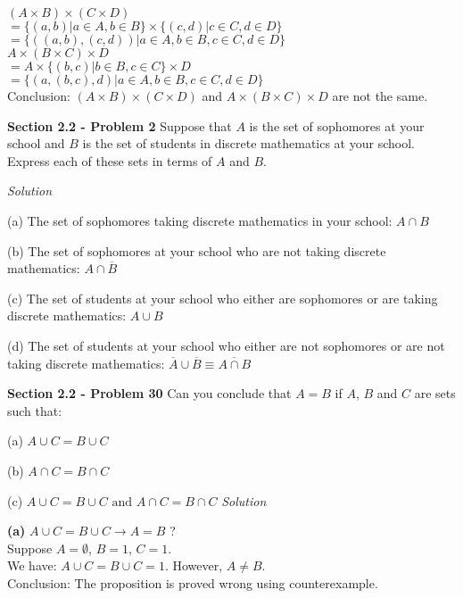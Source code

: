 \documentclass[10pt]{article}
\renewcommand{\implies}{\rightarrow}
\begin{document}
    $(A \times B) \times (C \times D)$ \\
    $= \{(a, b) | a \in A, b \in B\} \times \{(c, d) | c \in C, d \in D\} $ \\
    $= \{((a, b), (c, d)) | a \in A, b \in B, c \in C, d \in D\}$ \\
    \break
    $A \times (B \times C) \times D$ \\
    $= A \times \{(b, c) | b \in B, c \in C\} \times D$ \\
    $= \{(a, (b, c), d) | a \in A, b \in B, c \in C, d \in D\}$ \\
    \break
    Conclusion: $(A \times B) \times (C \times D)$ and $A \times (B \times C) \times D$
    are not the same.


\clearpage
\textbf{Section 2.2 - Problem 2} Suppose that $A$ is the set of sophomores at your school
and $B$ is the set of students in discrete mathematics at your school. Express each of these
sets in terms of $A$ and $B$.

\bigbreak
\textit{Solution} 
\bigbreak

    \par (a) The set of sophomores taking discrete mathematics in your school: $A \cap B$
    \par (b) The set of sophomores at your school who are not taking discrete mathematics:
    $A \cap \overline{B}$
    \par (c) The set of students at your school who either are sophomores or are taking
    discrete mathematics: $A \cup B$
    \par (d) The set of students at your school who either are not sophomores or are not
    taking discrete mathematics: $\overline{A} \cup \overline{B} \equiv \overline{A \cap B}$

\clearpage
\textbf{Section 2.2 - Problem 30} Can you conclude that $A = B$ if $A$, $B$ and $C$ are sets
such that:
\par (a) $A \cup C = B \cup C$
\par (b) $A \cap C = B \cap C$
\par (c) $A \cup C = B \cup C \mbox{ and } A \cap C = B \cap C$
\bigbreak
\textit{Solution} 
\bigbreak

    \par \textbf{(a)} $A \cup C = B \cup C \implies A = B$ ? \\
        Suppose $A = \emptyset$, $B = {1}$, $C = {1}$. \\
        We have: $A \cup C = B \cup C = {1}$. However, $A \neq B$. \\
        Conclusion: The proposition is proved wrong using counterexample.
\end{document}
